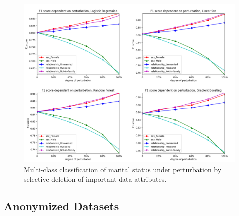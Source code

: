 \documentclass{llncs}
\begin{document}
\begin{figure}[!h]
	\centering
	\includegraphics[width=1\textwidth]{figures/perturbation/adults_marital_status/perturb_marital_combined}
	\caption{Multi-class classification of marital status under perturbation by selective deletion of important data attributes.}
	\label{fig:results_perturbation_marital_status}
\end{figure}



\subsection{Anonymized Datasets}
\label{ssect:anonymized_ds}

\end{document}
